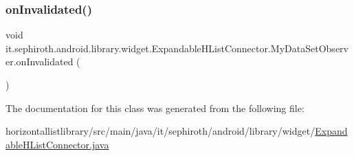 \subsubsection{\texorpdfstring{on\+Invalidated()}{onInvalidated()}}
{\footnotesize\ttfamily void it.\+sephiroth.\+android.\+library.\+widget.\+Expandable\+H\+List\+Connector.\+My\+Data\+Set\+Observer.\+on\+Invalidated (\begin{DoxyParamCaption}{ }\end{DoxyParamCaption})}



The documentation for this class was generated from the following file\+:\begin{DoxyCompactItemize}
\item 
horizontallistlibrary/src/main/java/it/sephiroth/android/library/widget/\hyperlink{_expandable_h_list_connector_8java}{Expandable\+H\+List\+Connector.\+java}\end{DoxyCompactItemize}
